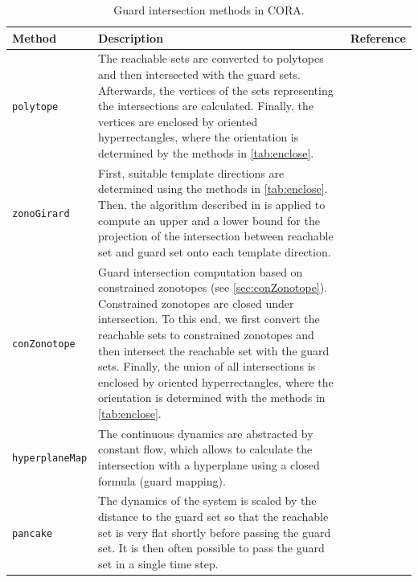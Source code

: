 \begin{table}
    \centering
    \caption{Guard intersection methods in CORA.}
    \label{tab:guardIntersection}
    \begin{tabular}{l p{10cm} c}
        \toprule
        \textbf{Method}        & \textbf{Description}                                                                                                                                                                                                                                                                                                                                                                                                                                      & \textbf{Reference}     \\
        \midrule
        \texttt{polytope}      & The reachable sets are converted to polytopes and then intersected with the guard sets. Afterwards, the vertices of the sets representing the intersections are calculated. Finally, the vertices are enclosed by oriented hyperrectangles, where the orientation is determined by the methods in \cref{tab:enclose}. & \cite{Althoff2010d} \\
        \texttt{zonoGirard}    & First, suitable template directions are determined using the methods in \cref{tab:enclose}. Then, the algorithm described in \cite{Girard2008} is applied to compute an upper and a lower bound for the projection of the intersection between reachable set and guard set onto each template direction. & \cite{Girard2008} \\
        \texttt{conZonotope}   & Guard intersection computation based on constrained zonotopes (see \cref{sec:conZonotope}). Constrained zonotopes are closed under intersection. To this end, we first convert the reachable sets to constrained zonotopes and then intersect the reachable set with the guard sets. Finally, the union of all intersections is enclosed by oriented hyperrectangles, where the orientation is determined with the methods in \cref{tab:enclose}. & \\
        \texttt{hyperplaneMap} & The continuous dynamics are abstracted by constant flow, which allows to calculate the intersection with a hyperplane using a closed formula (guard mapping). & \cite{Althoff2012a} \\
        \texttt{pancake}       & The dynamics of the system is scaled by the distance to the guard set so that the reachable set is very flat shortly before passing the guard set. It is then often possible to pass the guard set in a single time step. & \cite{Bak2017} \\

\end{tabular}
\end{table}
